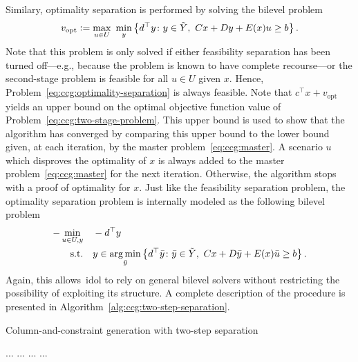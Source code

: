 Similary, optimality separation is performed by solving the bilevel problem
\begin{equation}
    \label{eq:ccg:optimality-separation}
    v_\text{opt} \mathrel{{\mathop:}{=}}
    \max_{u\in U} \ \min_{y} \left\{ d^\top y \colon
        y\in\tilde{Y}, \ Cx + Dy + E(x)u \ge b
    \right\}.
\end{equation}
Note that this problem is only solved if either feasibility separation has
been turned off---e.g., because the problem is known to have complete
recourse---or the second-stage problem is feasible for all $u\in U$ given $x$.
Hence, Problem~\eqref{eq:ccg:optimality-separation} is always feasible. Note
that $c^\top x + v_\text{opt}$ yields an upper bound on the optimal objective
function value of Problem~\eqref{eq:ccg:two-stage-problem}. This upper bound
is used to show that the algorithm has converged by comparing this upper bound
to the lower bound given, at each iteration, by the master
problem~\eqref{eq:ccg:master}. A scenario $u$ which disproves the optimality
of $x$ is always added to the master problem~\eqref{eq:ccg:master} for the
next iteration. Otherwise, the algorithm stops with a proof of optimality for
$x$. Just like the feasibility separation problem, the optimality separation
problem is internally modeled as the following bilevel problem
%
\begin{equation}
    \begin{aligned}
        - \min_{u\in U,y} \quad & -d^\top y \\
        \text{s.t.} \quad & y \in \operatorname*{arg\,min}_{\bar{y}} \left\{ d^\top \bar{y} \colon
            \bar{y}\in\tilde{Y}, \ Cx + D\bar{y} + E(x)\bar{u} \ge b
        \right\}.
    \end{aligned}
    \label{eq:ccg:optimality-separation-bilevel}
\end{equation}
Again, this allows~\textsf{idol} to rely on general bilevel solvers without
restricting the possibility of exploiting its structure. A complete
description of the procedure is presented in
Algorithm~\ref{alg:ccg:two-step-separation}.

\begin{algorithm}
    \caption{Column-and-constraint generation with two-step separation}
    \label{alg:ccg:two-step-separation}
    \begin{algorithmic}[1]
        \State ...
        \While {}
        \State ...
            \State ... 
        \EndIf
        \State ...
        \EndWhile
    \end{algorithmic}
\end{algorithm}

